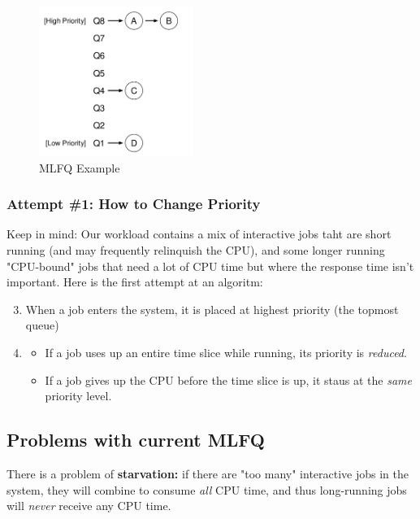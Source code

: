 \begin{figure}[h!]
    \begin{center}
        \includegraphics[width=5cm]{img/81.png}
        \caption{MLFQ Example}
    \end{center}
\end{figure}

\subsubsection{Attempt \#1: How to Change Priority}

Keep in mind: Our workload contains a mix of interactive jobs taht are short
running (and may frequently relinquish the CPU), and some longer running
"CPU-bound" jobs that need a lot of CPU time but where the response time
isn't important. Here is the first attempt at an algoritm:

\begin{enumerate}
        \setcounter{enumi}{2}
    \item When a job enters the system, it is placed at highest
        priority (the topmost queue)
    \item 
        \begin{itemize}
            \item If a job uses up an entire time slice while running, 
                its priority is \textit{reduced}.
            \item If a job gives up the CPU before the time slice is up,
                it staus at the \textit{same} priority level.
        \end{itemize}
\end{enumerate}

\subsection{Problems with current MLFQ}

There is a problem of \textbf{starvation:} if there are "too many" interactive
jobs in the system, they will combine to consume \textit{all} CPU time, and
thus long-running jobs will \textit{never} receive any CPU time.\\

